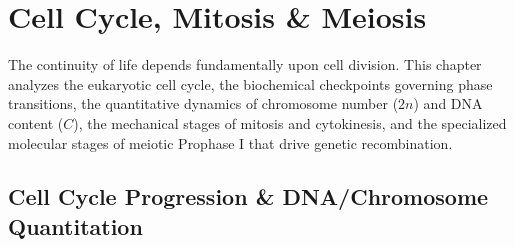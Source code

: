 \documentclass[10pt,twoside,openright]{book}
\begin{document}
\chapter{Cell Cycle, Mitosis \& Meiosis}

The continuity of life depends fundamentally upon cell division. This chapter analyzes the eukaryotic cell cycle, the biochemical checkpoints governing phase transitions, the quantitative dynamics of chromosome number ($2n$) and DNA content ($C$), the mechanical stages of mitosis and cytokinesis, and the specialized molecular stages of meiotic Prophase I that drive genetic recombination.

\section{Cell Cycle Progression \& DNA/Chromosome Quantitation}
\end{document}

